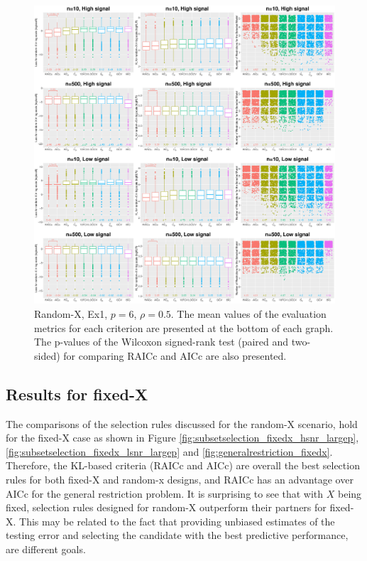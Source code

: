 \begin{figure}[!ht]
  \centering
  \includegraphics[width=\textwidth]{figures/main/randomx/general_restriction/Ex1.eps}
  \caption{Random-X, Ex1, $p=6$, $\rho=0.5$. The mean values of the evaluation metrics for each criterion are presented at the bottom of each graph. The p-values of the Wilcoxon signed-rank test (paired and two-sided) for comparing RAICc and AICc are also presented.}
  \label{fig:generalrestriction_randomx}
\end{figure}


\subsection{Results for fixed-X}
The comparisons of the selection rules discussed for the random-X scenario, hold for the fixed-X case as shown in Figure \ref{fig:subsetselection_fixedx_hsnr_largep}, \ref{fig:subsetselection_fixedx_lsnr_largep} and \ref{fig:generalrestriction_fixedx}. Therefore, the KL-based criteria (RAICc and AICc) are overall the best selection rules for both fixed-X and random-x designs, and RAICc has an advantage over AICc for the general restriction problem. It is surprising to see that with $X$ being fixed, selection rules designed for random-X outperform their partners for fixed-X. This may be related to the fact that providing unbiased estimates of the testing error and selecting the candidate with the best predictive performance, are different goals.  

